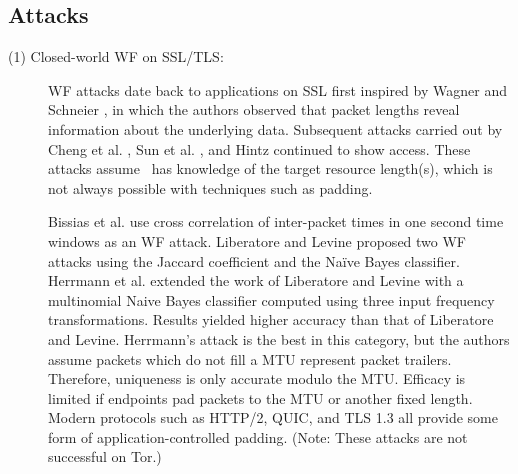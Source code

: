 \documentclass[runningheads]{llncs}
\begin{document}
\subsection{Attacks}

\begin{description}
\item [(1) Closed-world WF on SSL/TLS:] WF attacks date back to applications on SSL first inspired by Wagner and
Schneier \cite{wagner1996analysis}, in which the authors observed that
packet lengths reveal information about the underlying data. Subsequent attacks
carried out by Cheng et al. \cite{cheng1998traffic},
Sun et al. \cite{sun2002statistical}, and Hintz \cite{hintz2002fingerprinting} continued to show access.
These attacks assume \adv\ has knowledge of the target resource length(s),
which is not always possible with techniques such as padding.

Bissias et al. \cite{bissias2005privacy} use cross correlation of inter-packet
times in one second time windows as an WF attack.
Liberatore and Levine \cite{liberatore2006inferring} proposed two WF attacks
using the Jaccard coefficient and the Na\"{i}ve Bayes classifier.
Herrmann et al. \cite{herrmann2009website} extended the work of Liberatore and Levine with a multinomial
Naive Bayes classifier computed using three input frequency transformations.
Results yielded higher accuracy than that of Liberatore and Levine.
Herrmann's attack is the best in this category, but the authors assume packets which do not fill a MTU
represent packet trailers. Therefore, uniqueness is only accurate modulo the MTU. Efficacy
is limited if endpoints pad packets to the MTU or another fixed length. Modern protocols
such as HTTP/2, QUIC, and TLS 1.3 all provide some form of application-controlled padding.
(Note: These attacks are not successful on Tor.)


\end{description}
\end{document}
